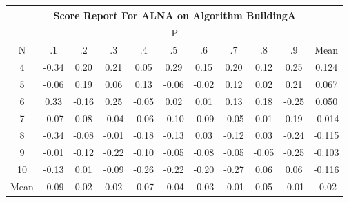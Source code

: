 \documentclass[11pt,a4paper]{report}
\begin{document}
\begin{longtable}{ | c || c | c | c | c | c | c | c | c | c || c |}
\hline
\multicolumn{11}{|c|}{ Score Report For ALNA on Algorithm BuildingA} \\
\hline
\multicolumn{11}{|c|}{ P } \\
\hline
N & .1 & .2 & .3 & .4 & .5 & .6 & .7 & .8 & .9 & Mean\\
 \hline
 \hline
 \endhead
  4 &  \cellcolor[HTML]{FFF7F7} -0.34 &  \cellcolor[HTML]{F7F7FF} 0.20 &  \cellcolor[HTML]{F7F7FF} 0.21 &  \cellcolor[HTML]{FFFFFF} 0.05 &  \cellcolor[HTML]{F7F7FF} 0.29 &  \cellcolor[HTML]{FFFFFF} 0.15 &  \cellcolor[HTML]{F7F7FF} 0.20 &  \cellcolor[HTML]{FFFFFF} 0.12 &  \cellcolor[HTML]{F7F7FF} 0.25 & 0.124 \\
  5 &  \cellcolor[HTML]{FFFFFF} -0.06 &  \cellcolor[HTML]{F7F7FF} 0.19 &  \cellcolor[HTML]{FFFFFF} 0.06 &  \cellcolor[HTML]{FFFFFF} 0.13 &  \cellcolor[HTML]{FFFFFF} -0.06 &  \cellcolor[HTML]{FFFFFF} -0.02 &  \cellcolor[HTML]{FFFFFF} 0.12 &  \cellcolor[HTML]{FFFFFF} 0.02 &  \cellcolor[HTML]{F7F7FF} 0.21 & 0.067 \\
  6 &  \cellcolor[HTML]{F7F7FF} 0.33 &  \cellcolor[HTML]{FFF7F7} -0.16 &  \cellcolor[HTML]{F7F7FF} 0.25 &  \cellcolor[HTML]{FFFFFF} -0.05 &  \cellcolor[HTML]{FFFFFF} 0.02 &  \cellcolor[HTML]{FFFFFF} 0.01 &  \cellcolor[HTML]{FFFFFF} 0.13 &  \cellcolor[HTML]{F7F7FF} 0.18 &  \cellcolor[HTML]{FFF7F7} -0.25 & 0.050 \\
  7 &  \cellcolor[HTML]{FFFFFF} -0.07 &  \cellcolor[HTML]{FFFFFF} 0.08 &  \cellcolor[HTML]{FFFFFF} -0.04 &  \cellcolor[HTML]{FFFFFF} -0.06 &  \cellcolor[HTML]{FFFFFF} -0.10 &  \cellcolor[HTML]{FFFFFF} -0.09 &  \cellcolor[HTML]{FFFFFF} -0.05 &  \cellcolor[HTML]{FFFFFF} 0.01 &  \cellcolor[HTML]{F7F7FF} 0.19 & -0.014 \\
  8 &  \cellcolor[HTML]{FFF7F7} -0.34 &  \cellcolor[HTML]{FFFFFF} -0.08 &  \cellcolor[HTML]{FFFFFF} -0.01 &  \cellcolor[HTML]{FFF7F7} -0.18 &  \cellcolor[HTML]{FFFFFF} -0.13 &  \cellcolor[HTML]{FFFFFF} 0.03 &  \cellcolor[HTML]{FFFFFF} -0.12 &  \cellcolor[HTML]{FFFFFF} 0.03 &  \cellcolor[HTML]{FFF7F7} -0.24 & -0.115 \\
  9 &  \cellcolor[HTML]{FFFFFF} -0.01 &  \cellcolor[HTML]{FFFFFF} -0.12 &  \cellcolor[HTML]{FFF7F7} -0.22 &  \cellcolor[HTML]{FFFFFF} -0.10 &  \cellcolor[HTML]{FFFFFF} -0.05 &  \cellcolor[HTML]{FFFFFF} -0.08 &  \cellcolor[HTML]{FFFFFF} -0.05 &  \cellcolor[HTML]{FFFFFF} -0.05 &  \cellcolor[HTML]{FFF7F7} -0.25 & -0.103 \\
  10 &  \cellcolor[HTML]{FFFFFF} -0.13 &  \cellcolor[HTML]{FFFFFF} 0.01 &  \cellcolor[HTML]{FFFFFF} -0.09 &  \cellcolor[HTML]{FFF7F7} -0.26 &  \cellcolor[HTML]{FFF7F7} -0.22 &  \cellcolor[HTML]{FFF7F7} -0.20 &  \cellcolor[HTML]{FFF7F7} -0.27 &  \cellcolor[HTML]{FFFFFF} 0.06 &  \cellcolor[HTML]{FFFFFF} 0.06 & -0.116 \\
 \hline
 \hline
Mean &  \cellcolor[HTML]{FFFFFF} -0.09 &  \cellcolor[HTML]{FFFFFF} 0.02 &  \cellcolor[HTML]{FFFFFF} 0.02 &  \cellcolor[HTML]{FFFFFF} -0.07 &  \cellcolor[HTML]{FFFFFF} -0.04 &  \cellcolor[HTML]{FFFFFF} -0.03 &  \cellcolor[HTML]{FFFFFF} -0.01 &  \cellcolor[HTML]{FFFFFF} 0.05 &  \cellcolor[HTML]{FFFFFF} -0.01 &  \cellcolor[HTML]{FFFFFF} -0.02
\end{longtable}
\end{document}
